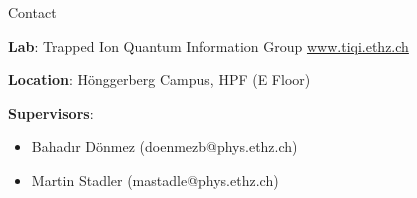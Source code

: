 \documentclass{project-proposal}
\begin{document}
\begin{section}{Contact}

 \textbf{Lab}:\newline
 Trapped Ion Quantum Information Group\newline
 \url{www.tiqi.ethz.ch} \newline


 \textbf{Location}:\newline
 Hönggerberg Campus, HPF (E Floor)\newline

 \textbf{Supervisors}:
 \begin{itemize}
     \item {Bahadır Dönmez (doenmezb@phys.ethz.ch)}
     \item {Martin Stadler (mastadle@phys.ethz.ch)}
 \end{itemize}

\end{section}
\end{document}
